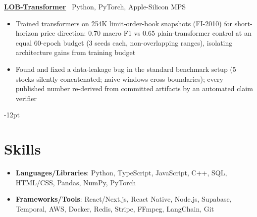 \documentclass[letterpaper,11pt]{article}
\newcommand{\resumeProjectRow}[4]{%
  \textbf{#1} \textbar\ #2 \\
  \vspace{2pt}
  {\small
  \begin{itemize}[leftmargin=2em, topsep=1pt, itemsep=1pt, parsep=0pt, partopsep=0pt, label=$\circ$]
    #3
  \end{itemize}}
}
\begin{document}
\resumeProjectRow
  {\href{https://github.com/david-cui-bruno/lob-transformer}{LOB-Transformer}}
  {Python, PyTorch, Apple-Silicon MPS}
  {
    \item Trained transformers on 254K limit-order-book snapshots (FI-2010) for short-horizon price direction: 0.70 macro F1 vs 0.65 plain-transformer control at an equal 60-epoch budget (3 seeds each, non-overlapping ranges), isolating architecture gains from training budget
    \item Found and fixed a data-leakage bug in the standard benchmark setup (5 stocks silently concatenated; naive windows cross boundaries); every published number re-derived from committed artifacts by an automated claim verifier
  }

\vspace{-12pt}

\section{Skills}
  \begin{itemize}[leftmargin=*, label={}, itemsep=0pt, parsep=2pt, topsep=2pt]
    \item\small{\textbf{Languages/Libraries}: Python, TypeScript, JavaScript, C++, SQL, HTML/CSS, Pandas, NumPy, PyTorch}
    \item\small{\textbf{Frameworks/Tools}: React/Next.js, React Native, Node.js, Supabase, Temporal, AWS, Docker, Redis, Stripe, FFmpeg, LangChain, Git}
  \end{itemize}

\end{document}
